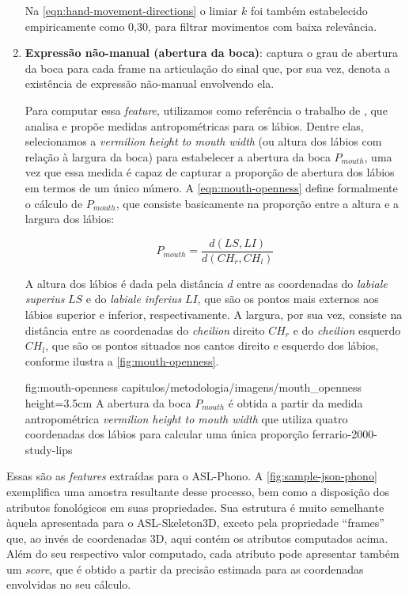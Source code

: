 \begin{enumerate}
          Na \autoref{eqn:hand-movement-directions} o limiar \(k\) foi também estabelecido empiricamente como 0,30, para filtrar movimentos com baixa relevância.


    \item \textbf{Expressão não-manual (abertura da boca)}: captura o grau de abertura da boca para cada frame na articulação do sinal que, por sua vez, denota a existência de expressão não-manual envolvendo ela.

          Para computar essa \textit{feature}, utilizamos como referência o trabalho de , que analisa e propõe medidas antropométricas para os lábios.
          Dentre elas, selecionamos a \textit{vermilion height to mouth width} (ou altura dos lábios com relação à largura da boca) para estabelecer a abertura da boca \(P_{mouth}\), uma vez que essa medida é capaz de capturar a proporção de abertura dos lábios em termos de um único número.
          A \autoref{eqn:mouth-openness} define formalmente o cálculo de \(P_{mouth}\), que consiste basicamente na proporção entre a altura e a largura dos lábios:

          \begin{equation}
              \label{eqn:mouth-openness}
              P_{mouth} = \frac{d(LS, LI)}{d(CH_r, CH_l)}
          \end{equation}

          A altura dos lábios é dada pela distância \(d\) entre as coordenadas do \textit{labiale superius} \(LS\) e do \textit{labiale inferius} \(LI\), que são os pontos mais externos aos lábios superior e inferior, respectivamente. A largura, por sua vez, consiste na distância entre as coordenadas do \textit{cheilion} direito \(CH_r\) e do \textit{cheilion} esquerdo \(CH_l\), que são os pontos situados nos cantos direito e esquerdo dos lábios, conforme ilustra a \autoref{fig:mouth-openness}.

          \figura
          {fig:mouth-openness} %
          {capitulos/metodologia/imagens/mouth_openness} %
          {height=3.5cm} %
          {A abertura da boca \(P_{mouth}\) é obtida a partir da medida antropométrica \textit{vermilion height to mouth width} que utiliza quatro coordenadas dos lábios para calcular uma única proporção} %
          {ferrario-2000-study-lips} %

\end{enumerate}


Essas são as \textit{features} extraídas para o ASL-Phono.
A \autoref{fig:sample-json-phono} exemplifica uma amostra resultante desse processo, bem como a disposição dos atributos fonológicos em suas propriedades.
Sua estrutura é muito semelhante àquela apresentada para o ASL-Skeleton3D, exceto pela propriedade ``frames'' que, ao invés de coordenadas 3D, aqui contém os atributos computados acima. Além do seu respectivo valor computado, cada atributo pode apresentar também um \textit{score}, que é obtido a partir da precisão estimada para as coordenadas envolvidas no seu cálculo.


